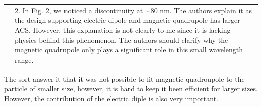 \documentclass[a4paper]{article}
\begin{document}

\begin{tabular}[!H]{l|p{}}
  \quad &  2.      In Fig. 2, we noticed a discontinuity at $\sim$80
  nm. The authors explain it as the design supporting electric dipole
  and magnetic quadrupole has larger ACS. However, this explanation is
  not clearly to me since it is lacking physics behind this
  phenomenon. The authors should clarify why the magnetic quadrupole
  only plays a significant role in this small wavelength range. 
\end{tabular}

The sort answer it that it was not possible to fit magnetic
quadroupole to the particle of smaller size, however, it is hard to
keep it been efficient for larger sizes. However, the contribution of
the electric diple is also very important.
\end{document}
